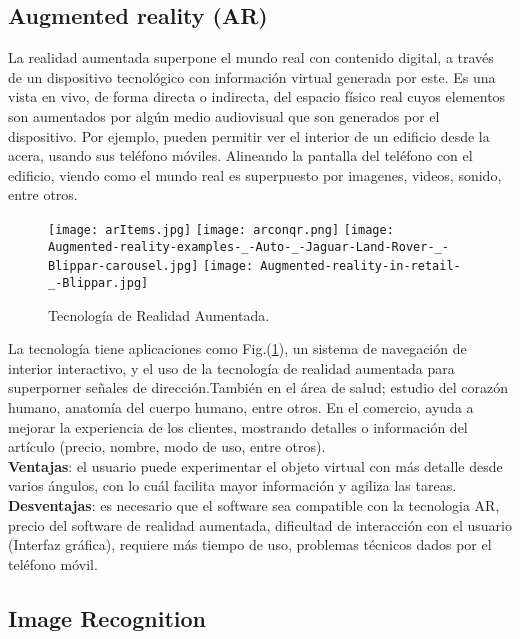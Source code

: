 \subsection{Augmented reality (AR)}
La realidad aumentada superpone el mundo real con contenido digital, a través de un dispositivo tecnológico con información virtual generada por este. Es una vista en vivo, de forma directa o indirecta, del espacio físico real cuyos elementos son aumentados por algún medio audiovisual que son generados por el dispositivo. Por ejemplo, pueden permitir ver el interior de un edificio desde la acera, usando sus teléfono móviles. Alineando la pantalla del teléfono con el edificio, viendo como el mundo real es superpuesto por imagenes, videos, sonido, entre otros.\cite{2011BOOK,2012_Waters_BOOK}
\begin{figure} 	
	\centering
	\texttt{[image: arItems.jpg]}
	\texttt{[image: arconqr.png]}
	\texttt{[image: Augmented-reality-examples-\_-Auto-\_-Jaguar-Land-Rover-\_-Blippar-carousel.jpg]}
	\texttt{[image: Augmented-reality-in-retail-\_-Blippar.jpg]}
	\caption{Tecnología de Realidad Aumentada.}
	\label{fig:ar}
\end{figure}
La tecnología tiene aplicaciones como Fig.(\ref{fig:ar}),  un sistema de navegación de interior interactivo, y el uso de la tecnología de realidad aumentada para superporner señales de dirección.También en el área de salud; estudio del corazón humano, anatomía del cuerpo humano, entre otros.	En el comercio, ayuda a mejorar la experiencia de los clientes, mostrando detalles o información del artículo (precio, nombre, modo de uso, entre otros). \cite{2021_Ong_THESIS,2021_Romli,2021_Fernandes} 
\\
\textbf{Ventajas}: el usuario puede experimentar el objeto virtual con más detalle desde varios ángulos, con lo cuál facilita mayor información y agiliza las tareas. \cite{2021_Romli}
\\
\textbf{Desventajas}: es necesario que el software sea compatible con la tecnologia AR, precio del software de realidad aumentada, dificultad de interacción con el usuario (Interfaz gráfica), requiere más tiempo de uso, problemas técnicos dados por el teléfono móvil.\cite{2018_Gavilanes}

\subsection{Image Recognition}


